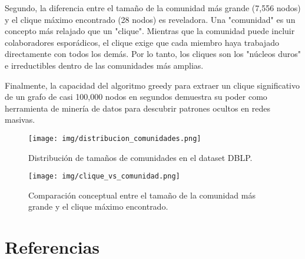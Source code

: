 \documentclass[12pt,a4paper]{report}
\begin{document}
Segundo, la diferencia entre el tamaño de la comunidad más grande (7,556 nodos) y el clique máximo encontrado (28 nodos) es reveladora. Una "comunidad" es un concepto más relajado que un "clique". Mientras que la comunidad puede incluir colaboradores esporádicos, el clique exige que cada miembro haya trabajado directamente con todos los demás. Por lo tanto, los cliques son los "núcleos duros" e irreductibles dentro de las comunidades más amplias.

Finalmente, la capacidad del algoritmo greedy para extraer un clique significativo de un grafo de casi 100,000 nodos en segundos demuestra su poder como herramienta de minería de datos para descubrir patrones ocultos en redes masivas.

\begin{figure}[H]
    \centering
    \texttt{[image: img/distribucion\_comunidades.png]}
    \caption{Distribución de tamaños de comunidades en el dataset DBLP.}
    \label{fig:distribucion_comunidades}
\end{figure}

\begin{figure}[H]
    \centering
    \texttt{[image: img/clique\_vs\_comunidad.png]}
    \caption{Comparación conceptual entre el tamaño de la comunidad más grande y el clique máximo encontrado.}
    \label{fig:clique_vs_comunidad}
\end{figure}

\newpage

\chapter{Referencias}
\end{document}
